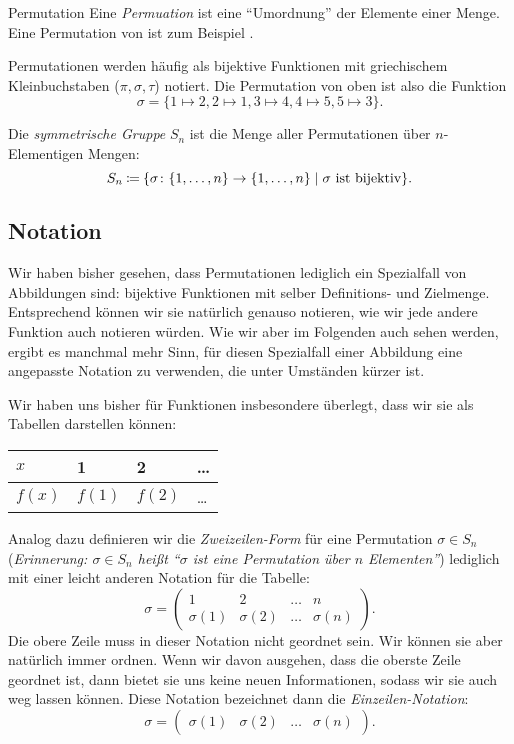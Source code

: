 \documentclass[../../main.tex]{subfiles}
\begin{document}
\begin{nutshell}{Permutation}
    Eine \emph{Permuation} ist eine \enquote{Umordnung} der Elemente einer Menge.
    Eine Permutation von \blueball\redball\greenball\orangeball\violetball{} ist zum Beispiel \redball\blueball\orangeball\violetball\greenball.
    
    Permutationen werden häufig als bijektive Funktionen mit griechischem Kleinbuchstaben ($\pi, \sigma, \tau$) notiert. Die Permutation von oben ist also die Funktion
    \[\sigma = \{1\mapsto 2, 2 \mapsto 1, 3\mapsto 4, 4\mapsto 5, 5\mapsto 3\}.\]
    
    Die \emph{symmetrische Gruppe} $S_n$ ist die Menge aller Permutationen über $n$-Elementigen Mengen:
    \[S_n \mathbin{\coloneqq} \{\sigma\colon \{1,\dots,n\}\to\{1,\dots, n\} \mid \sigma\text{ ist bijektiv}\}.\]
\end{nutshell}

\subsection{Notation}
Wir haben bisher gesehen, dass Permutationen lediglich ein Spezialfall von Abbildungen sind: bijektive Funktionen mit selber Definitions- und Zielmenge. Entsprechend können wir sie natürlich genauso notieren, wie wir jede andere Funktion auch notieren würden. Wie wir aber im Folgenden auch sehen werden, ergibt es manchmal mehr Sinn, für diesen Spezialfall einer Abbildung eine angepasste Notation zu verwenden, die unter Umständen kürzer ist.

Wir haben uns bisher für Funktionen insbesondere überlegt, dass wir sie als Tabellen darstellen können:
\begin{center}
    \begin{tabular}{l||*{2}{l|}l}
        $x$ & 1 & 2 & \dots\\\hline
        $f(x)$ & $f(1)$ & $f(2)$ & \dots
    \end{tabular}
\end{center}
Analog dazu definieren wir die \emph{Zweizeilen-Form} für eine Permutation $\sigma\in S_n$ (\emph{Erinnerung: $\sigma \in S_n$ heißt \enquote{$\sigma$ ist eine Permutation über $n$ Elementen}}) lediglich mit einer leicht anderen Notation für die Tabelle:
\[\sigma = \begin{pmatrix}1 & 2 & \dots & n\\ \sigma(1) & \sigma(2) & \dots & \sigma(n)\end{pmatrix}.\]
Die obere Zeile muss in dieser Notation nicht geordnet sein. Wir können sie aber natürlich immer ordnen. Wenn wir davon ausgehen, dass die oberste Zeile geordnet ist, dann bietet sie uns keine neuen Informationen, sodass wir sie auch weg lassen können. Diese Notation bezeichnet dann die \emph{Einzeilen-Notation}:
\[\sigma = \begin{pmatrix}\sigma(1) & \sigma(2) & \dots & \sigma(n)\end{pmatrix}.\]
\end{document}
